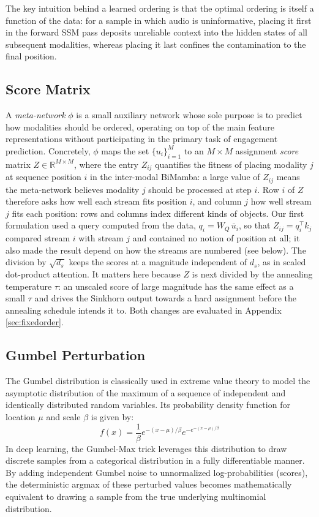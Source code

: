 \documentclass[10pt,a4paper,twocolumn]{article}
\newcommand{\R}{\mathbb{R}}
\begin{document}
	The key intuition behind a learned ordering is that the optimal ordering is itself a function of the data: for a sample in which audio is uninformative, placing it first in the forward SSM pass deposits unreliable context into the hidden states of all subsequent modalities, whereas placing it last confines the contamination to the final position.
	
	\subsection*{Score Matrix}
	A \emph{meta-network} $\phi$ is a small auxiliary network whose sole purpose is to predict how modalities should be ordered, operating on top of the main feature representations without participating in the primary task of engagement prediction. Concretely, $\phi$ maps the set $\{u_i\}_{i=1}^M$ to an $M \times M$ assignment \emph{score} matrix $Z \in \R^{M \times M}$, where the entry $Z_{ij}$ quantifies the fitness of placing modality $j$ at sequence position $i$ in the inter-modal BiMamba: a large value of $Z_{ij}$ means the meta-network believes modality $j$ should be processed at step $i$. Row $i$ of $Z$ therefore asks how well each stream fits position $i$, and column $j$ how well stream $j$ fits each position: rows and columns index different kinds of objects. Our first formulation used a query computed from the data, $q_i = W_Q\,\bar{u}_i$, so that $Z_{ij} = q_i^\top k_j$ compared stream $i$ with stream $j$ and contained no notion of position at all; it also made the result depend on how the streams are numbered (see below). The division by $\sqrt{d_s}$ keeps the scores at a magnitude independent of $d_s$, as in scaled dot-product attention. It matters here because $Z$ is next divided by the annealing temperature $\tau$: an unscaled score of large magnitude has the same effect as a small $\tau$ and drives the Sinkhorn output towards a hard assignment before the annealing schedule intends it to. Both changes are evaluated in Appendix \ref{sec:fixedorder}.
	
	\subsection*{Gumbel Perturbation}
	The Gumbel distribution is classically used in extreme value theory \cite{gumbel1954} to model the asymptotic distribution of the maximum of a sequence of independent and identically distributed random variables. Its probability density function for location $\mu$ and scale $\beta$ is given by:
	$$f(x) = \frac{1}{\beta} e^{-(x-\mu)/\beta} e^{-e^{-(x-\mu)/\beta}}$$
	In deep learning, the Gumbel-Max trick \cite{jang2017} leverages this distribution to draw discrete samples from a categorical distribution in a fully differentiable manner. By adding independent Gumbel noise to unnormalized log-probabilities (scores), the deterministic argmax of these perturbed values becomes mathematically equivalent to drawing a sample from the true underlying multinomial distribution.
	
\end{document}
